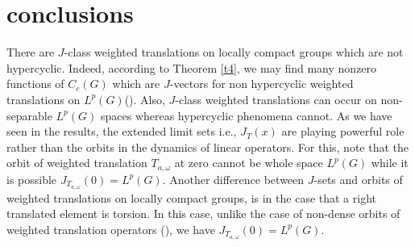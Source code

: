 \documentclass{amsart}
\theoremstyle{definition}\newtheorem{defn}[thm]{Definition}
\theoremstyle{remark}
\numberwithin{equation}{section}
\begin{document}
\section{conclusions}
There are $J$-class weighted translations on locally compact groups
which are not hypercyclic. Indeed, according to Theorem \ref{t4}, we
may find many nonzero functions of $C_c(G)$ which are $J$-vectors
for non hypercyclic weighted translations on $L^p(G)$(\cite[Theorem
2.2]{chu}). Also,  $J$-class weighted translations  can occur on
non-separable $L^p(G)$ spaces whereas hypercyclic phenomena cannot.
As we have seen in the results, the extended limit sets i.e.,
$J_T(x)$ are playing powerful role rather than the orbits in the
dynamics of linear operators. For this, note that  the orbit of
weighted translation $T_{a,\omega}$ at zero cannot be whole space
$L^p(G)$ while it is possible $J_{T_{a,\omega}}(0)=L^p(G)$. Another
difference between $J$-sets and orbits of weighted translations on
locally compact groups, is in the case that  a right translated
element is torsion. In this case, unlike the case of non-dense
orbits of weighted translation operators (\cite[Lemma 1.1]{chu}), we
have $J_{T_{a,\omega}}(0)=L^p(G)$.
\end{document}
